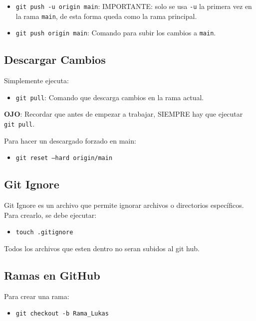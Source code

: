 \documentclass{article} %
\begin{document}
\begin{itemize}
    \item \texttt{git push -u origin main}: IMPORTANTE: solo se usa \texttt{-u} la primera vez en la rama \texttt{main}, de esta forma queda como la rama principal.
    \item \texttt{git push origin main}: Comando para subir los cambios a \texttt{main}.
\end{itemize}

\subsection{Descargar Cambios}

Simplemente ejecuta:

\begin{itemize}
    \item \texttt{git pull}: Comando que descarga cambios en la rama actual.
\end{itemize}

\textbf{OJO}: Recordar que antes de empezar a trabajar, SIEMPRE hay que ejecutar \texttt{git pull}.

Para hacer un descargado forzado en main:

\begin{itemize}
    \item \texttt{git reset --hard origin/main}
\end{itemize}

\subsection{Git Ignore}

Git Ignore es un archivo que permite ignorar archivos o directorios específicos. Para crearlo, se debe ejecutar:

\begin{itemize}
    \item \texttt{touch .gitignore}
\end{itemize}

Todos los archivos que esten dentro no seran subidos al git hub.

\subsection{Ramas en GitHub}

Para crear una rama:

\begin{itemize}
    \item \texttt{git checkout -b Rama\_Lukas}
\end{itemize}
\end{document}
